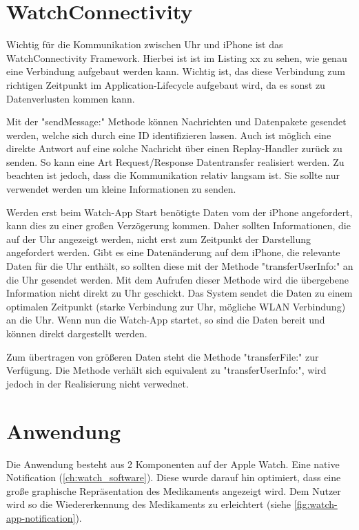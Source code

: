 \section{WatchConnectivity}
Wichtig für die Kommunikation zwischen Uhr und iPhone ist das WatchConnectivity Framework. Hierbei ist ist im Listing xx zu sehen, wie genau eine Verbindung aufgebaut werden kann. Wichtig ist, das diese Verbindung zum richtigen Zeitpunkt im Application-Lifecycle aufgebaut wird, da es sonst zu Datenverlusten kommen kann. 

Mit der "sendMessage:" Methode können Nachrichten und Datenpakete gesendet werden, welche sich durch eine ID identifizieren lassen. Auch ist möglich eine direkte Antwort auf eine solche Nachricht über einen Replay-Handler zurück zu senden. So kann eine Art Request/Response Datentransfer realisiert werden. Zu beachten ist jedoch, dass die Kommunikation relativ langsam ist. Sie sollte nur verwendet werden um kleine Informationen zu senden.

Werden erst beim Watch-App Start benötigte Daten vom der iPhone angefordert, kann dies zu einer großen Verzögerung kommen. Daher sollten Informationen, die auf der Uhr angezeigt werden, nicht erst zum Zeitpunkt der Darstellung angefordert werden. Gibt es eine Datenänderung auf dem iPhone, die relevante Daten für die Uhr enthält, so sollten diese mit der Methode "transferUserInfo:" an die Uhr gesendet werden. Mit dem Aufrufen dieser Methode wird die übergebene Information nicht direkt zu Uhr geschickt. Das System sendet die Daten zu einem optimalen Zeitpunkt (starke Verbindung zur Uhr, mögliche WLAN Verbindung) an die Uhr. Wenn nun die Watch-App startet, so sind die Daten bereit und können direkt dargestellt werden.

Zum übertragen von größeren Daten steht die Methode "transferFile:" zur Verfügung. Die Methode verhält sich equivalent zu "transferUserInfo:", wird jedoch in der Realisierung nicht verwednet.

\section{Anwendung}

Die Anwendung besteht aus 2 Komponenten auf der Apple Watch. Eine native Notification (\ref{ch:watch_software}). Diese wurde darauf hin optimiert, dass eine große graphische Repräsentation des Medikaments angezeigt wird. Dem Nutzer wird so die Wiedererkennung des Medikaments zu erleichtert (siehe \ref{fig:watch-app-notification}).

